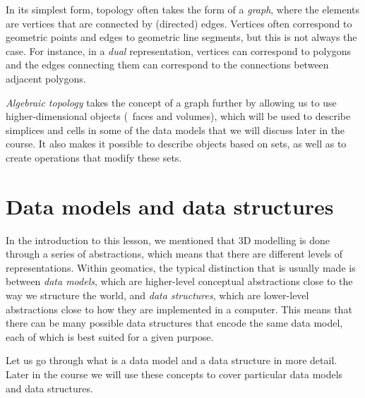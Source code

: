 \begin{description}
In its simplest form, topology often takes the form of a \emph{graph}, where the elements are vertices that are connected by (directed) edges.
Vertices often correspond to geometric points and edges to geometric line segments, but this is not always the case.
For instance, in a \emph{dual} representation, vertices can correspond to polygons and the edges connecting them can correspond to the connections between adjacent polygons.

\emph{Algebraic topology} takes the concept of a graph further by allowing us to use higher-dimensional objects (\eg\ faces and volumes), which will be used to describe simplices and cells in some of the data models that we will discuss later in the course.
It also makes it possible to describe objects based on sets, as well as to create operations that modify these sets.

\end{description}

\section{Data models and data structures}

In the introduction to this lesson, we mentioned that 3D modelling is done through a series of abstractions, which means that there are different levels of representations.
Within geomatics, the typical distinction that is usually made is between \emph{data models}, which are higher-level conceptual abstractions close to the way we structure the world, and \emph{data structures}, which are lower-level abstractions close to how they are implemented in a computer.
This means that there can be many possible data structures that encode the same data model, each of which is best suited for a given purpose.

Let us go through what is a data model and a data structure in more detail.
Later in the course we will use these concepts to cover particular data models and data structures.

